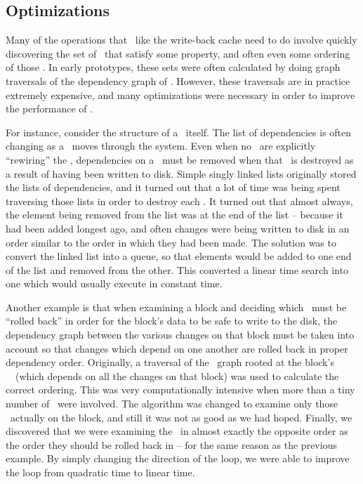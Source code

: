 \subsection {Optimizations}
Many of the operations that \modules\ like the write-back cache need to do
involve quickly discovering the set of \chdescs\ that satisfy some property,
and often even some ordering of those \chdescs. In early prototypes, these sets
were often calculated by doing graph traversals of the dependency graph of
\chdescs. However, these traversals are in practice extremely expensive, and
many optimizations were necessary in order to improve the performance of
\Kudos.

For instance, consider the structure of a \chdesc\ itself. The list of
dependencies is often changing as a \chdesc\ moves through the system. Even
when no \modules\ are explicitly ``rewiring'' the \chdescs, dependencies on a
\chdesc\ must be removed when that \chdesc\ is destroyed as a result of having
been written to disk. Simple singly linked lists originally stored the lists of
dependencies, and it turned out that a lot of time was being spent traversing
those lists in order to destroy each \chdesc. It turned out that almost always,
the element being removed from the list was at the end of the list -- because
it had been added longest ago, and often changes were being written to disk in
an order similar to the order in which they had been made. The solution was to
convert the linked list into a queue, so that elements would be added to one
end of the list and removed from the other. This converted a linear time search
into one which would usually execute in constant time.

Another example is that when examining a block and deciding which \chdescs\
must be ``rolled back'' in order for the block's data to be safe to write to
the disk, the dependency graph between the various changes on that block must
be taken into account so that changes which depend on one another are rolled
back in proper dependency order. Originally, a traversal of the \chdesc\ graph
rooted at the block's \noop\ \chdesc\ (which depends on all the changes on that
block) was used to calculate the correct ordering. This was very
computationally intensive when more than a tiny number of \chdescs\ were
involved. The algorithm was changed to examine only those \chdescs\ actually on
the block, and still it was not as good as we had hoped. Finally, we discovered
that we were examining the \chdescs\ in almost exactly the opposite order as
the order they should be rolled back in -- for the same reason as the previous
example. By simply changing the direction of the loop, we were able to improve
the loop from quadratic time to linear time.


